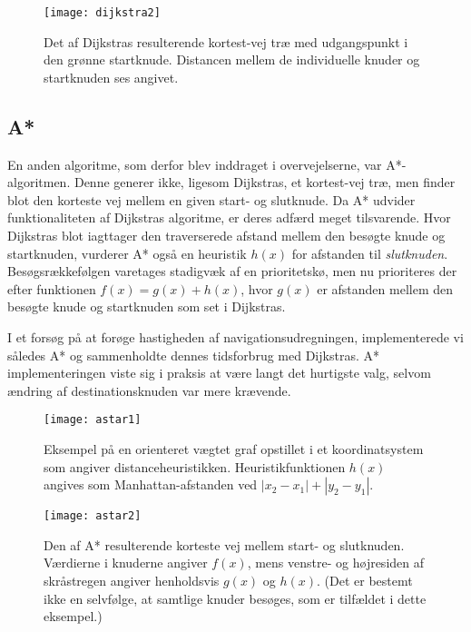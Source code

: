\begin{figure}[ht]
	\centering
  \texttt{[image: dijkstra2]}
  \captionsetup{width=0.8\textwidth}
  \caption{Det af Dijkstras resulterende kortest-vej træ med udgangspunkt i den grønne startknude. Distancen mellem de individuelle knuder og startknuden ses angivet.}
  \label{fig:dijkstra2}
\end{figure}

\subsection{A*}
\label{subsec:astar}
En anden algoritme, som derfor blev inddraget i overvejelserne, var A*-algoritmen. Denne generer ikke, ligesom Dijkstras, et kortest-vej træ, men finder blot den korteste vej mellem en given start- og slutknude. Da A* udvider funktionaliteten af Dijkstras algoritme, er deres adfærd meget tilsvarende. Hvor Dijkstras blot iagttager den traverserede afstand mellem den besøgte knude og startknuden, vurderer A* også en heuristik $h(x)$ for afstanden til \emph{slutknuden}. Besøgsrækkefølgen varetages stadigvæk af en prioritetskø, men nu prioriteres der efter funktionen $f(x)=g(x)+h(x)$, hvor $g(x)$ er afstanden mellem den besøgte knude og startknuden som set i Dijkstras.

I et forsøg på at forøge hastigheden af navigationsudregningen, implementerede vi således A* og sammenholdte dennes tidsforbrug med Dijkstras. A* implementeringen viste sig i praksis at være langt det hurtigste valg, selvom ændring af destinationsknuden var mere krævende.

\begin{figure}[ht]
	\centering
  \texttt{[image: astar1]}
  \captionsetup{width=0.8\textwidth}
	\caption{Eksempel på en orienteret vægtet graf opstillet i et koordinatsystem som angiver distanceheuristikken. Heuristikfunktionen $h(x)$ angives som Manhattan-afstanden ved $|x_2-x_1|+|y_2-y_1|$.}
  \label{fig:astar1}
\end{figure}

\begin{figure}[ht]
	\centering
  \texttt{[image: astar2]}
  \captionsetup{width=0.8\textwidth}
	\caption{Den af A* resulterende korteste vej mellem start- og slutknuden. Værdierne i knuderne angiver $f(x)$, mens venstre- og højresiden af skråstregen angiver henholdsvis $g(x)$ og $h(x)$. (Det er bestemt ikke en selvfølge, at samtlige knuder besøges, som er tilfældet i dette eksempel.)}
  \label{fig:astar2}
\end{figure}

